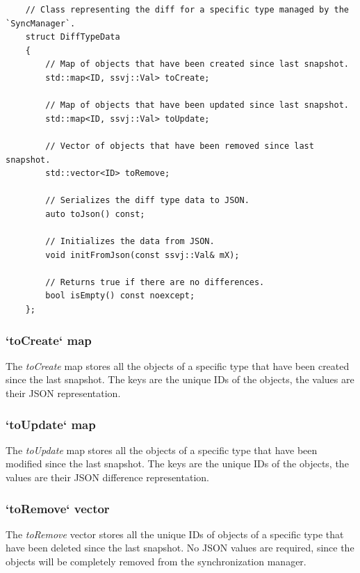 \documentclass{report}
\begin{document}
\begin{verbatim}
    // Class representing the diff for a specific type managed by the `SyncManager`.
    struct DiffTypeData
    {
        // Map of objects that have been created since last snapshot.
        std::map<ID, ssvj::Val> toCreate;

        // Map of objects that have been updated since last snapshot.
        std::map<ID, ssvj::Val> toUpdate;
        
        // Vector of objects that have been removed since last snapshot.
        std::vector<ID> toRemove;

        // Serializes the diff type data to JSON.
        auto toJson() const;

        // Initializes the data from JSON.
        void initFromJson(const ssvj::Val& mX);

        // Returns true if there are no differences.
        bool isEmpty() const noexcept;
    };
\end{verbatim}

                \subsubsection{`toCreate` map}

                    The \emph{toCreate} map stores all the objects of a specific type that have been created since the last snapshot.
                    The keys are the unique IDs of the objects, the values are their JSON representation.

                \subsubsection{`toUpdate` map}

                    The \emph{toUpdate} map stores all the objects of a specific type that have been modified since the last snapshot.
                    The keys are the unique IDs of the objects, the values are their JSON difference representation.

                \subsubsection{`toRemove` vector}

                    The \emph{toRemove} vector stores all the unique IDs of objects of a specific type that have been deleted since the last snapshot.
                    No JSON values are required, since the objects will be completely removed from the synchronization manager.
        
\end{document}
